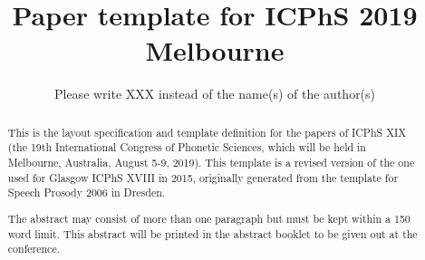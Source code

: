 \title{Paper template for {ICPhS} 2019 Melbourne}
\author{Please write XXX instead of the name(s) of the author(s)}


\maketitle

\begin{abstract}
This is the layout specification and template definition for the papers of 
ICPhS XIX (the 19th International Congress of Phonetic Sciences, which will be 
held in Melbourne, Australia, August 5-9, 2019). This template is a revised 
version of the one used for Glasgow ICPhS XVIII in 2015, originally generated 
from the template for Speech Prosody 2006 in Dresden.

The abstract may consist of more than one paragraph but must be kept within a 
150 word limit. This abstract will be printed in the abstract booklet to be 
given out at the conference.
\end{abstract}


